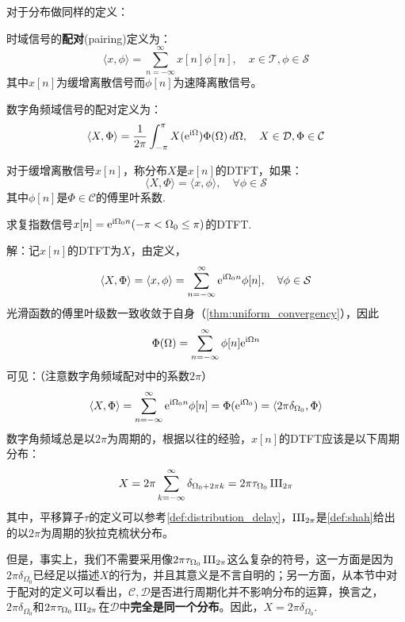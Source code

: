 对于分布做同样的定义：

\begin{definition}[配对]
    时域信号的\textbf{配对}(pairing)定义为：
    $$\langle x,\phi\rangle=\sum_{n=-\infty}^\infty x[n]\phi[n],\quad x\in \mathcal{T},\phi\in\mathcal{S}$$
    其中$x[n]$为缓增离散信号而$\phi[n]$为速降离散信号。

    数字角频域信号的配对定义为：
    $$\langle X,\Phi\rangle=\frac{1}{2\pi}\int_{-\pi}^\pi X(\mathrm{e}^{\mathrm{i}\Omega})\Phi(\Omega)\,d\Omega,\quad X\in\mathcal{D},\Phi\in\mathcal{C}$$
\end{definition}

\begin{definition}[缓增离散信号的离散时间傅里叶变换]
    对于缓增离散信号$x[n]$，称分布$X$是$x[n]$的DTFT，如果：
    $$\langle X,\Phi\rangle=\langle x,\phi\rangle,\quad \forall \phi\in\mathcal{S}$$
    其中$\phi[n]$是$\Phi\in\mathcal{C}$的傅里叶系数.
\end{definition}

\begin{example}[复指数信号的离散时间傅里叶变换]\label{exmp:exp_DTFT}
    求复指数信号$x[n]=\mathrm{e}^{\mathrm{i}\Omega_0 n}(-\pi<\Omega_0\le\pi)$的DTFT.

    解：记$x[n]$的DTFT为$X$，由定义，
    $$\langle X,\Phi\rangle=\langle x,\phi\rangle=\sum_{n=-\infty}^{\infty}\mathrm{e}^{\mathrm{i}\Omega_0 n}\phi[n],\quad \forall \phi\in\mathcal{S}$$
    光滑函数的傅里叶级数一致收敛于自身（\cref{thm:uniform_convergency}），因此
    $$\Phi(\Omega)=\sum_{n=-\infty}^\infty \phi[n]\mathrm{e}^{\mathrm{i}\Omega n}$$
    可见：（注意数字角频域配对中的系数$2\pi$）
    $$\langle X,\Phi\rangle=\sum_{n=-\infty}^{\infty}\mathrm{e}^{\mathrm{i}\Omega_0 n}\phi[n]=\Phi(\mathrm{e}^{\mathrm{i}\Omega_0})=\langle 2\pi\delta_{\Omega_0},\Phi\rangle$$
    数字角频域总是以$2\pi$为周期的，根据以往的经验，$x[n]$的DTFT应该是以下周期分布：
    $$X=2\pi\sum_{k=-\infty}^{\infty}\delta_{\Omega_0+2\pi k}=2\pi\tau_{\Omega_0}\operatorname{III}_{2\pi}$$
    其中，平移算子$\tau$的定义可以参考\cref{def:distribution_delay}，$\operatorname{III}_{2\pi}$是\cref{def:shah}给出的以$2\pi$为周期的狄拉克梳状分布。

    但是，事实上，我们不需要采用像$2\pi\tau_{\Omega_0}\operatorname{III}_{2\pi}$这么复杂的符号，这一方面是因为$2\pi\delta_{\Omega_0}$已经足以描述$X$的行为，并且其意义是不言自明的；另一方面，从本节中对于配对的定义可以看出，$\mathcal{C,D}$是否进行周期化并不影响分布的运算，换言之，$2\pi\delta_{\Omega_0}$和$2\pi\tau_{\Omega_0}\operatorname{III}_{2\pi}$在$\mathcal{D}$中\textbf{完全是同一个分布}。因此，$X=2\pi\delta_{\Omega_0}$.
\end{example}

